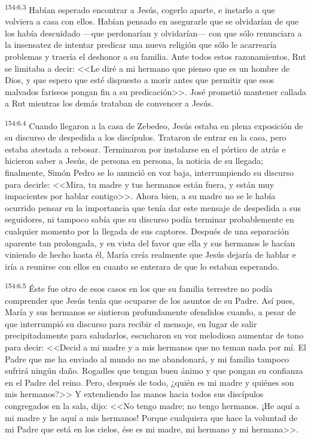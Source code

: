 \par 
\textsuperscript{154:6.3} Habían esperado encontrar a Jesús, cogerlo aparte, e instarlo a que volviera a casa con ellos. Habían pensado en asegurarle que se olvidarían de que los había descuidado ---que perdonarían y olvidarían--- con que sólo renunciara a la insensatez de intentar predicar una nueva religión que sólo le acarrearía problemas y traería el deshonor a su familia. Ante todos estos razonamientos, Rut se limitaba a decir: <<Le diré a mi hermano que pienso que es un hombre de Dios, y que espero que esté dispuesto a morir antes que permitir que esos malvados fariseos pongan fin a su predicación>>. José prometió mantener callada a Rut mientras los demás trataban de convencer a Jesús.

\par 
\textsuperscript{154:6.4} Cuando llegaron a la casa de Zebedeo, Jesús estaba en plena exposición de su discurso de despedida a los discípulos. Trataron de entrar en la casa, pero estaba atestada a rebosar. Terminaron por instalarse en el pórtico de atrás e hicieron saber a Jesús, de persona en persona, la noticia de su llegada; finalmente, Simón Pedro se lo anunció en voz baja, interrumpiendo su discurso para decirle: <<Mira, tu madre y tus hermanos están fuera, y están muy impacientes por hablar contigo>>. Ahora bien, a su madre no se le había ocurrido pensar en la importancia que tenía dar este mensaje de despedida a sus seguidores, ni tampoco sabía que su discurso podía terminar probablemente en cualquier momento por la llegada de sus captores. Después de una separación aparente tan prolongada, y en vista del favor que ella y sus hermanos le hacían viniendo de hecho hasta él, María creía realmente que Jesús dejaría de hablar e iría a reunirse con ellos en cuanto se enterara de que lo estaban esperando.

\par 
\textsuperscript{154:6.5} Éste fue otro de esos casos en los que su familia terrestre no podía comprender que Jesús tenía que ocuparse de los asuntos de su Padre. Así pues, María y sus hermanos se sintieron profundamente ofendidos cuando, a pesar de que interrumpió su discurso para recibir el mensaje, en lugar de salir precipitadamente para saludarlos, escucharon su voz melodiosa aumentar de tono para decir: <<Decid a mi madre y a mis hermanos que no teman nada por mí. El Padre que me ha enviado al mundo no me abandonará, y mi familia tampoco sufrirá ningún daño. Rogadles que tengan buen ánimo y que pongan su confianza en el Padre del reino. Pero, después de todo, ¿quién es mi madre y quiénes son mis hermanos?>> Y extendiendo las manos hacia todos sus discípulos congregados en la sala, dijo: <<No tengo madre; no tengo hermanos. ¡He aquí a mi madre y he aquí a mis hermanos! Porque cualquiera que hace la voluntad de mi Padre que está en los cielos, ése es mi madre, mi hermano y mi hermana>>.

